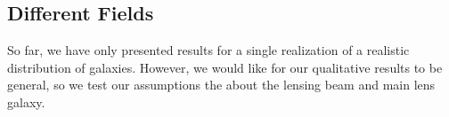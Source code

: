 \subsection{Different Fields}\label{sec:B1422}
So far, we have only presented results for a single realization of a realistic distribution of galaxies. However, we would like for our qualitative results to be general, so we test our assumptions the about the lensing beam and main lens galaxy.